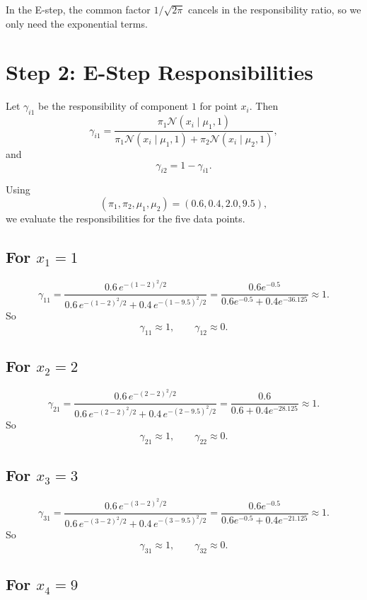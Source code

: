 \documentclass[11pt]{article}
\begin{document}
In the E-step, the common factor \(1/\sqrt{2\pi}\) cancels in the responsibility
ratio, so we only need the exponential terms.

\section*{Step 2: E-Step Responsibilities}

Let \(\gamma_{i1}\) be the responsibility of component \(1\) for point \(x_i\). Then
\[
    \gamma_{i1}
    =
    \frac{\pi_1 \mathcal{N}(x_i\mid \mu_1,1)}
    {\pi_1 \mathcal{N}(x_i\mid \mu_1,1)+\pi_2 \mathcal{N}(x_i\mid \mu_2,1)},
\]
and
\[
    \gamma_{i2}=1-\gamma_{i1}.
\]

Using
\[
    (\pi_1,\pi_2,\mu_1,\mu_2)=(0.6,0.4,2.0,9.5),
\]
we evaluate the responsibilities for the five data points.

\subsection*{For \(x_1=1\)}

\[
    \gamma_{11}
    =
    \frac{0.6\,e^{-(1-2)^2/2}}
    {0.6\,e^{-(1-2)^2/2}+0.4\,e^{-(1-9.5)^2/2}}
    =
    \frac{0.6e^{-0.5}}{0.6e^{-0.5}+0.4e^{-36.125}}
    \approx 1.
\]
So
\[
    \gamma_{11}\approx 1,\qquad \gamma_{12}\approx 0.
\]

\subsection*{For \(x_2=2\)}

\[
    \gamma_{21}
    =
    \frac{0.6\,e^{-(2-2)^2/2}}
    {0.6\,e^{-(2-2)^2/2}+0.4\,e^{-(2-9.5)^2/2}}
    =
    \frac{0.6}{0.6+0.4e^{-28.125}}
    \approx 1.
\]
So
\[
    \gamma_{21}\approx 1,\qquad \gamma_{22}\approx 0.
\]

\subsection*{For \(x_3=3\)}

\[
    \gamma_{31}
    =
    \frac{0.6\,e^{-(3-2)^2/2}}
    {0.6\,e^{-(3-2)^2/2}+0.4\,e^{-(3-9.5)^2/2}}
    =
    \frac{0.6e^{-0.5}}{0.6e^{-0.5}+0.4e^{-21.125}}
    \approx 1.
\]
So
\[
    \gamma_{31}\approx 1,\qquad \gamma_{32}\approx 0.
\]

\subsection*{For \(x_4=9\)}
\end{document}
